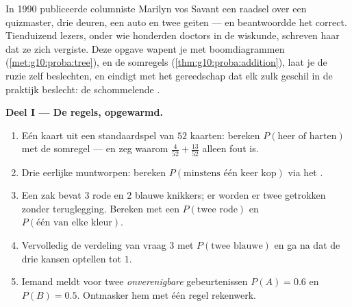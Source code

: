 \begin{problem}
\label{pb:g10:proba:1}
In 1990 publiceerde columniste Marilyn vos Savant een raadsel over een
quizmaster, drie deuren, een auto en twee geiten --- en beantwoordde het
correct. Tienduizend lezers, onder wie honderden doctors in de wiskunde,
schreven haar dat ze zich vergiste. Deze opgave wapent je met boomdiagrammen
(\cref{met:g10:proba:tree}),  en de somregels
(\cref{thm:g10:proba:addition}), laat je de ruzie zelf beslechten, en eindigt
met het gereedschap dat elk zulk geschil in de praktijk beslecht: de
schommelende .

\medskip
\noindent\textbf{Deel I --- De regels, opgewarmd.}
\begin{enumerate}
  \item Eén kaart uit een standaardspel van $52$ kaarten: bereken
        $P(\text{heer of harten})$ met de somregel --- en zeg waarom
        $\frac{4}{52} + \frac{13}{52}$ alleen fout is.
  \item Drie eerlijke muntworpen: bereken $P(\text{minstens één keer kop})$
        via het .
  \item Een zak bevat $3$ rode en $2$ blauwe knikkers; er worden er twee
        getrokken zonder teruglegging. Bereken met een 
        $P(\text{twee rode})$ en $P(\text{één van elke kleur})$.
  \item Vervolledig de verdeling van vraag 3 met $P(\text{twee blauwe})$ en
        ga na dat de drie kansen optellen tot $1$.
  \item Iemand meldt voor twee \emph{onverenigbare} gebeurtenissen
        $P(A) = 0.6$ en $P(B) = 0.5$. Ontmasker hem met één regel rekenwerk.
\end{enumerate}


\end{problem}
